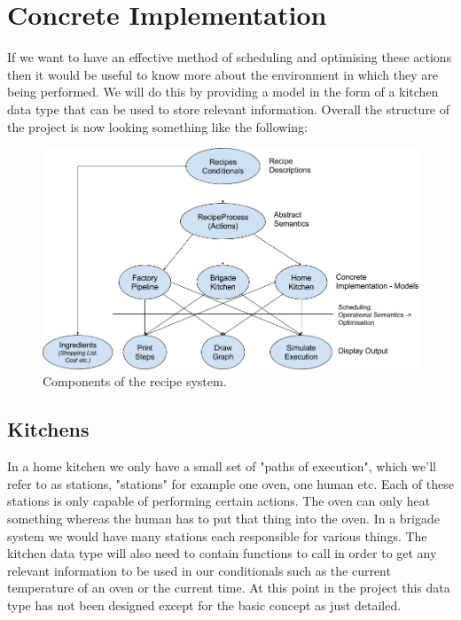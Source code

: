 \documentclass[11pt]{article}
\begin{document}
    \section{Concrete Implementation}

    If we want to have an effective method of scheduling and optimising these actions then it would
    be useful to know more about the environment in which they are being performed. We will do this
    by providing a model in the form of a kitchen data type that can be used to store relevant
    information. Overall the structure of the project is now looking something like the following:
    
    \begin{figure}[ht]
        \centering
            \includegraphics[width=\textwidth,keepaspectratio]{recipe_flow.png}
        \caption{Components of the recipe system.}
    \end{figure}

    \subsection{Kitchens}

    In a home kitchen we only have a small set of "paths of execution", which we'll refer to as stations,
    "stations" for example one oven, one human etc. Each of these stations is only capable of performing
    certain actions. The oven can only heat something whereas the human has to put that thing into the oven.
    In a brigade system we would have many stations each responsible for various things. The kitchen data
    type will also need to contain functions to call in order to get any relevant information to be used
    in our conditionals such as the current temperature of an oven or the current time. At this point in
    the project this data type has not been designed except for the basic concept as just detailed.
\end{document}
